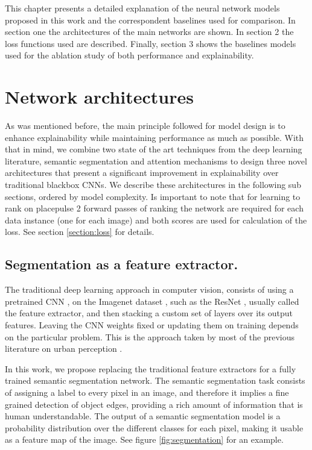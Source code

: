 This chapter presents a detailed explanation of the neural network models proposed in this work and
the correspondent baselines used for comparison. In section one the architectures of
the main networks are shown. In section 2 the loss functions used are described. Finally,
section 3 shows the baselines models used for the ablation study of both performance and
explainability.

\section{Network architectures}
As was mentioned before, the main principle followed for model design is to enhance explainability
while maintaining performance as much as possible. With that in mind, we combine two
state of the art techniques from the deep learning literature, semantic segmentation
and attention mechanisms to design three novel architectures that present a significant
improvement in explainability over traditional blackbox CNNs. We describe these architectures
in the following sub sections, ordered by model complexity. Is important to note that
for learning to rank on placepulse
2 forward passes of ranking the network are required for each data instance (one for each image) and both scores are used
for calculation of the loss. See section \ref{section:loss} for  details.


\subsection{Segmentation as a feature extractor.}
The traditional deep learning approach in computer vision, consists of using a pretrained
CNN \cite{lecun_mnist}, on the Imagenet dataset \cite{imagenet}, such as the ResNet \cite{he_resnet},
usually called the feature extractor, and then stacking a custom set of layers over its output features. Leaving the CNN weights
fixed or updating them on training  depends on the particular problem. This is the approach taken
by most of the previous literature on urban perception \cite{hidalgo_placepulse,tamara_judgments,zhang_measuring}.

In this work, we propose replacing the traditional feature extractors for a fully trained semantic segmentation
network. The semantic segmentation task consists of assigning a label to every pixel in an image, and therefore
it implies a fine grained detection of object edges, providing a rich amount of information that is human understandable.
The output of a semantic segmentation model is a probability distribution over the different classes for each pixel,
making it usable as a feature map of the image. See figure \ref{fig:segmentation} for an example.

